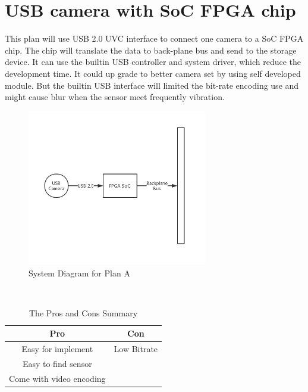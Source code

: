 \documentclass[12pt,article]{memoir}
\begin{document}
\section{USB camera with SoC FPGA chip}
This plan will use USB 2.0 UVC interface to connect one camera to a SoC FPGA chip. The chip will translate the data to back-plane bus and send to the storage device. It can use the builtin USB controller and system driver, which reduce the development time. It could up grade to better camera set by using self developed module. But the builtin USB interface will limited the bit-rate encoding use and might cause blur when the sensor meet frequently vibration.
\begin{figure}[htp]
\begin{center}
\includegraphics[width=0.7\textwidth]{img/DR00002_Plan1.png}
 \caption{System Diagram for Plan A}	
\end{center}
\end{figure}
\\
\begin{table}[H]
	\centering
		\begin{tabu}{c | c }
		Pro & Con \\ \hline
		Easy for implement & Low Bitrate \\
		Easy to find sensor &  \\
		Come with video encoding &  \\
		\end{tabu}
	\caption{The Pros and Cons Summary}
\end{table}
\newpage
\end{document}
